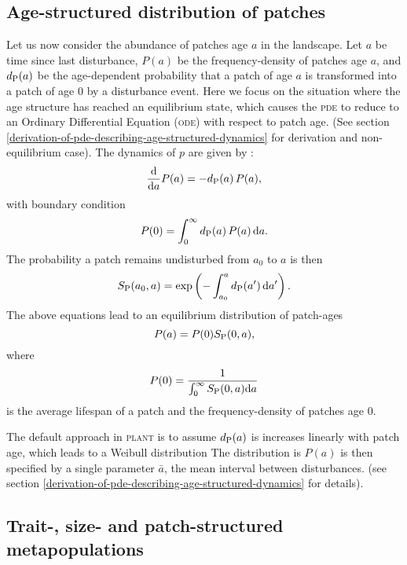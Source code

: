 \documentclass[10pt,twoside]{article}
\newcommand{\plant}{\textsc{plant}}
\begin{document}
\subsection{Age-structured distribution of
patches}\label{age-structured-distribution-of-patches}

Let us now consider the abundance of patches age \(a\) in the landscape.
Let \(a\) be time since last disturbance, \(P(a)\) be the
frequency-density of patches age \(a\), and \(d_{\rm P}(a)\) be the
age-dependent probability that a patch of age \(a\) is transformed into
a patch of age 0 by a disturbance event. Here we focus on the situation
where the age structure has reached an equilibrium state, which causes
the \textsc{pde} to reduce to an Ordinary Differential Equation (\textsc{ode}) with
respect to patch age. (See section
\ref{derivation-of-pde-describing-age-structured-dynamics} for derivation and
non-equilibrium case). The dynamics of \(p\) are given by
\citep{Vonfoerster-1959, Mckendrick-1926}:
\begin{equation} \label{eq:agepde}
\frac{{\rm d}}{{\rm d} a} P(a) = - d_{\rm P}(a) \, P(a) ,
\end{equation}
with boundary condition
\begin{equation}  P(0) = \int_0^\infty d_{\rm P}(a) \, P(a) \, {\rm d} a.
\end{equation}
The probability a patch remains undisturbed from \(a_0\) to \(a\) is
then
\begin{equation} \label{eq:survivalPatch}
  S_{\rm P} (a_0, a) = \exp\left( - \int_{a_0}^{a} d_{\rm P}(a^\prime) \, {\rm d} a^\prime \right).
\end{equation}
The above equations lead to an equilibrium distribution of patch-ages
\begin{equation} P(a) = P(0) S_{\rm P} (0, a),
\end{equation}
where
\begin{equation}
  P(0) = \frac1{\int_0^\infty S_{\rm P} (0, a) {\rm d}a}
\end{equation}
is the average lifespan of a patch and the frequency-density of patches
age \(0\).

The default approach in {\plant} is to assume  $d_{\rm P}(a)$ is
increases linearly with patch age, which leads to a Weibull distribution
The distribution is $P(a)$ is then specified by a single parameter $\bar{a}$,
the mean interval between disturbances. (see section \ref{derivation-of-pde-describing-age-structured-dynamics} for details).

\subsection{Trait-, size- and patch-structured
metapopulations}\label{trait--size--and-patch-structured-metapopulations}
\end{document}
